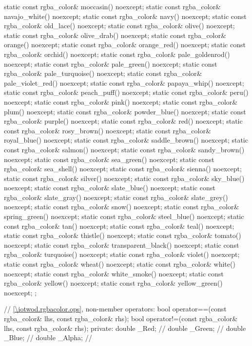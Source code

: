 \begin{codeblock}
{{{{{    static const rgba_color& moccasin() noexcept;
    static const rgba_color& navajo_white() noexcept;
    static const rgba_color& navy() noexcept;
    static const rgba_color& old_lace() noexcept;
    static const rgba_color& olive() noexcept;
    static const rgba_color& olive_drab() noexcept;
    static const rgba_color& orange() noexcept;
    static const rgba_color& orange_red() noexcept;
    static const rgba_color& orchid() noexcept;
    static const rgba_color& pale_goldenrod() noexcept;
    static const rgba_color& pale_green() noexcept;
    static const rgba_color& pale_turquoise() noexcept;
    static const rgba_color& pale_violet_red() noexcept;
    static const rgba_color& papaya_whip() noexcept;
    static const rgba_color& peach_puff() noexcept;
    static const rgba_color& peru() noexcept;
    static const rgba_color& pink() noexcept;
    static const rgba_color& plum() noexcept;
    static const rgba_color& powder_blue() noexcept;
    static const rgba_color& purple() noexcept;
    static const rgba_color& red() noexcept;
    static const rgba_color& rosy_brown() noexcept;
    static const rgba_color& royal_blue() noexcept;
    static const rgba_color& saddle_brown() noexcept;
    static const rgba_color& salmon() noexcept;
    static const rgba_color& sandy_brown() noexcept;
    static const rgba_color& sea_green() noexcept;
    static const rgba_color& sea_shell() noexcept;
    static const rgba_color& sienna() noexcept;
    static const rgba_color& silver() noexcept;
    static const rgba_color& sky_blue() noexcept;
    static const rgba_color& slate_blue() noexcept;
    static const rgba_color& slate_gray() noexcept;
    static const rgba_color& slate_grey() noexcept;
    static const rgba_color& snow() noexcept;
    static const rgba_color& spring_green() noexcept;
    static const rgba_color& steel_blue() noexcept;
    static const rgba_color& tan() noexcept;
    static const rgba_color& teal() noexcept;
    static const rgba_color& thistle() noexcept;
    static const rgba_color& tomato() noexcept;
    static const rgba_color& transparent_black() noexcept;
    static const rgba_color& turquoise() noexcept;
    static const rgba_color& violet() noexcept;
    static const rgba_color& wheat() noexcept;
    static const rgba_color& white() noexcept;
    static const rgba_color& white_smoke() noexcept;
    static const rgba_color& yellow() noexcept;
    static const rgba_color& yellow_green() noexcept;
  };

  // \ref{\iotwod.rgbacolor.ops}, non-member operators:
  bool operator==(const rgba_color& lhs, const rgba_color& rhs);
  bool operator!=(const rgba_color& lhs, const rgba_color& rhs);
private:
    double _Red;   // \expos
    double _Green; // \expos
    double _Blue;  // \expos
    double _Alpha; // \expos

} } } }
\end{codeblock}

